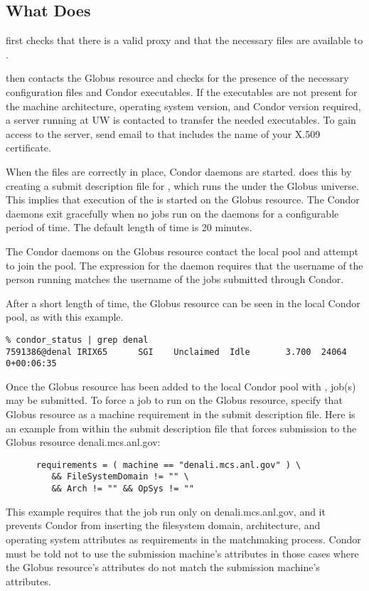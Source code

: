 \subsection{What  Does}

 first checks that there is a valid proxy
and that the necessary files are available to .

 then contacts the Globus resource and checks for the
presence of the necessary configuration files and Condor executables.
If the executables are not present for the machine architecture,
operating system version, and Condor version required, a
server running at UW is contacted to transfer the needed executables.
To gain access to the server, send email to 
that includes the name of your X.509 certificate.

When the files are correctly in place,
Condor daemons are started.
 does this by creating a submit description file for
, which runs the  under the Globus
universe.
This implies that execution of the  is started on the Globus
resource.
The Condor daemons exit gracefully when no jobs run on the daemons for a
configurable period of time. The default length of time is 20 minutes.

The Condor daemons on the Globus resource contact the local pool and
attempt to join the pool.  The 
expression for the  daemon requires that the username
of the person running  matches the username of the jobs
submitted through Condor.

After a short length of time,
the Globus resource can be seen in the local Condor pool,
as with this example.

\begin{verbatim}
% condor_status | grep denal
7591386@denal IRIX65      SGI    Unclaimed  Idle       3.700  24064  0+00:06:35
\end{verbatim}

Once the Globus resource has been added to the local Condor
pool with ,
job(s) may be submitted.
To force a job to run on the Globus resource,
specify that Globus resource as a machine requirement
in the submit description file. 
Here is an example from within the submit description file
that forces submission to the Globus resource denali.mcs.anl.gov:
\begin{verbatim}
      requirements = ( machine == "denali.mcs.anl.gov" ) \
         && FileSystemDomain != "" \
         && Arch != "" && OpSys != ""
\end{verbatim}
This example requires that the job run only on denali.mcs.anl.gov,
and it prevents Condor from inserting the filesystem domain,
architecture, and operating system attributes as requirements
in the matchmaking process.
Condor must be told not to use the submission machine's
attributes in those cases
where the Globus resource's attributes
do not match the submission machine's attributes.
